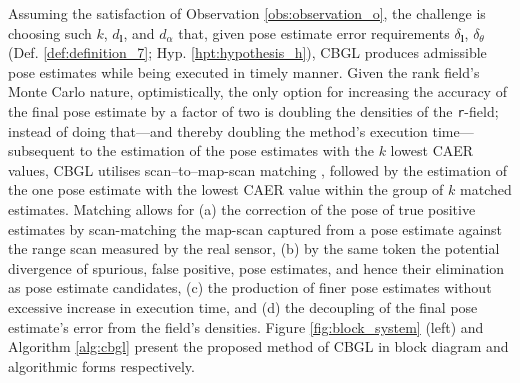 Assuming the satisfaction of Observation \ref{obs:observation_o}, the challenge
is choosing such $k$, $d_{\bm{l}}$, and $d_\alpha$ that, given pose estimate
error requirements $\delta_{\bm{l}}$, $\delta_{\theta}$ (Def.
\ref{def:definition_7}; Hyp.  \ref{hpt:hypothesis_h}), CBGL produces admissible
pose estimates while being executed in timely manner.  Given the rank field's
Monte Carlo nature, optimistically, the only option for increasing the accuracy
of the final pose estimate by a factor of two is doubling the densities of the
\texttt{r}-field; instead of doing that---and thereby doubling the method's
execution time---subsequent to the estimation of the pose estimates with the
$k$ lowest CAER values, CBGL utilises scan--to--map-scan matching
\cite{Vasiljevic2016c,Filotheou2023a}, followed by the estimation of the one
pose estimate with the lowest CAER value within the group of $k$ matched
estimates.
Matching allows for (a) the correction of the pose of true positive estimates
by scan-matching the map-scan captured from a pose estimate against the range
scan measured by the real sensor, (b) by the same token the potential
divergence of spurious, false positive, pose estimates, and hence their
elimination as pose estimate candidates, (c) the production of finer pose
estimates without excessive increase in execution time, and (d) the decoupling
of the final pose estimate's error from the field's densities.
Figure \ref{fig:block_system} (left) and Algorithm
\ref{alg:cbgl}
present the proposed method of CBGL in block diagram and algorithmic forms
respectively.

